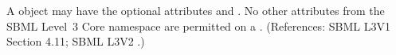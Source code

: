 A \KineticLaw object may have the optional attributes   and
.  No other attributes from the SBML Level~3 Core namespace
are permitted on a \KineticLaw.  (References: SBML L3V1 Section 4.11; SBML L3V2
.)
